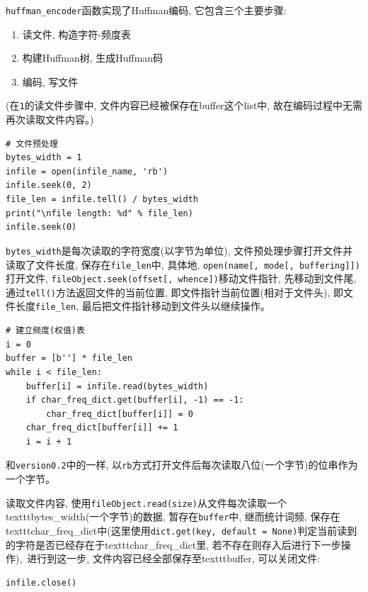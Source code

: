 \documentclass{ctexart}
\begin{document}
\texttt{huffman\_encoder}函数实现了Huffman编码, 它包含三个主要步骤:

\begin{enumerate}
\def\labelenumi{\arabic{enumi}.}
\item
  读文件, 构造字符-频度表
\item
  构建Huffman树, 生成Huffman码
\item
  编码, 写文件
\end{enumerate}

(在\texttt{1}的读文件步骤中, 文件内容已经被保存在buffer这个list中, 故在编码过程中无需再次读取文件内容。)

{\setmainfont{Courier New Bold}              
\begin{lstlisting}
# 文件预处理
bytes_width = 1
infile = open(infile_name, 'rb')
infile.seek(0, 2)
file_len = infile.tell() / bytes_width
print("\nfile length: %d" % file_len)
infile.seek(0)
\end{lstlisting}}

\texttt{bytes\_width}是每次读取的字符宽度(以字节为单位), 文件预处理步骤打开文件并读取了文件长度, 保存在\texttt{file\_len}中, 具体地, \texttt{open(name{[},\ mode{[},\ buffering{]}{]})}打开文件, \texttt{fileObject.seek(offset{[},\ whence{]})}移动文件指针, 先移动到文件尾, 通过\texttt{tell()}方法返回文件的当前位置, 即文件指针当前位置(相对于文件头), 即文件长度\texttt{file\_len}, 最后把文件指针移动到文件头以继续操作。

{\setmainfont{Courier New Bold}              
\begin{lstlisting}
# 建立频度(权值)表
i = 0
buffer = [b''] * file_len
while i < file_len:
    buffer[i] = infile.read(bytes_width)
    if char_freq_dict.get(buffer[i], -1) == -1:
        char_freq_dict[buffer[i]] = 0
    char_freq_dict[buffer[i]] += 1
    i = i + 1
\end{lstlisting}}

和\texttt{version0.2}中的一样, 以\texttt{rb}方式打开文件后每次读取八位(一个字节)的位串作为一个字节。

读取文件内容, 使用\texttt{fileObject.read(size)}从文件每次读取一个texttt{bytes\_width}(一个字节)的数据,
暂存在\texttt{buffer}中, 继而统计词频, 保存在texttt{char\_freq\_dict}中(这里使用\texttt{dict.get(key,\ default\ =\ None)}判定当前读到的字符是否已经存在于texttt{char\_freq\_dict}里, 若不存在则存入后进行下一步操作),\ 进行到这一步, 文件内容已经全部保存至texttt{buffer}, 可以关闭文件:

{\setmainfont{Courier New Bold}              
\begin{lstlisting}
infile.close()
\end{lstlisting}}
\end{document}
